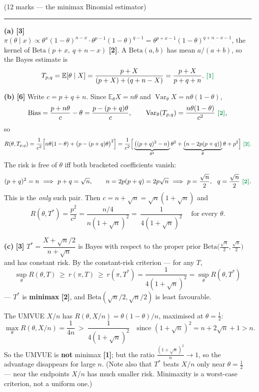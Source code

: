 \documentclass[11pt]{article}
\newcommand{\E}{\mathbb{E}}
\newcommand{\Var}{\operatorname{Var}}
\newcommand{\mk}[1]{{\small\color{ForestGreen}\textbf{[#1]}}}
\newcommand{\qhead}[2]{\bigskip\noindent{\large\bfseries Question #1}\quad\textnormal{\small(#2)}\par
  \vspace{2pt}\hrule\vspace{6pt}}
\begin{document}
\qhead{6}{12 marks --- the minimax Binomial estimator}

\noindent\textbf{(a)} \mk{3}
$\pi(\theta\mid x)\propto\theta^{x}(1-\theta)^{n-x}\cdot\theta^{p-1}(1-\theta)^{q-1}
=\theta^{p+x-1}(1-\theta)^{q+n-x-1}$, the kernel of $\mathrm{Beta}(p+x,\ q+n-x)$ \mk{2}.
A $\mathrm{Beta}(a,b)$ has mean $a/(a+b)$, so the Bayes estimate is
\[
T_{p,q}=\E[\theta\mid X]=\frac{p+X}{(p+X)+(q+n-X)}=\frac{p+X}{p+q+n}. \ \mk{1}
\]

\smallskip\noindent\textbf{(b)} \mk{6}
Write $c=p+q+n$. Since $\E_\theta X=n\theta$ and $\Var_\theta X=n\theta(1-\theta)$,
\[
\text{Bias}=\frac{p+n\theta}{c}-\theta=\frac{p-(p+q)\theta}{c},
\qquad
\Var_\theta(T_{p,q})=\frac{n\theta(1-\theta)}{c^{2}}\ \mk{2},
\]
so
\[
R(\theta,T_{p,q})=\frac{1}{c^{2}}\Big[n\theta(1-\theta)+\big(p-(p+q)\theta\big)^{2}\Big]
=\frac{1}{c^{2}}\Big[\underbrace{\big((p+q)^{2}-n\big)}_{\theta^{2}}\theta^{2}
+\underbrace{\big(n-2p(p+q)\big)}_{\theta}\theta+p^{2}\Big]\ \mk{2}.
\]
The risk is free of $\theta$ iff both bracketed coefficients vanish:
\[
(p+q)^{2}=n\ \Longrightarrow\ p+q=\sqrt n,
\qquad
n=2p(p+q)=2p\sqrt n\ \Longrightarrow\ p=\frac{\sqrt n}{2},\ \ q=\frac{\sqrt n}{2}\ \mk{2}.
\]
This is the \emph{only} such pair. Then $c=n+\sqrt n=\sqrt n(1+\sqrt n)$ and
\[
R(\theta,T^{*})=\frac{p^{2}}{c^{2}}=\frac{n/4}{n(1+\sqrt n)^{2}}
=\boxed{\ \frac{1}{4(1+\sqrt n)^{2}}\ }\quad\text{for every }\theta .
\]

\smallskip\noindent\textbf{(c)} \mk{3}
$T^{*}=\dfrac{X+\sqrt n/2}{n+\sqrt n}$ is Bayes with respect to the proper prior
$\mathrm{Beta}\big(\tfrac{\sqrt n}{2},\tfrac{\sqrt n}{2}\big)$ and has constant risk. By the
constant-risk criterion --- for any $T$,
\[
\sup_\theta R(\theta,T)\ \ge\ r(\pi,T)\ \ge\ r(\pi,T^{*})=\frac{1}{4(1+\sqrt n)^{2}}
=\sup_\theta R(\theta,T^{*})
\]
--- $T^{*}$ is \textbf{minimax} \mk{2}, and $\mathrm{Beta}(\sqrt n/2,\sqrt n/2)$ is least
favourable.

The UMVUE $X/n$ has $R(\theta,X/n)=\theta(1-\theta)/n$, maximised at $\theta=\tfrac12$:
\[
\max_\theta R(\theta,X/n)=\frac{1}{4n}\ >\ \frac{1}{4(1+\sqrt n)^{2}}
\quad\text{since }(1+\sqrt n)^{2}=n+2\sqrt n+1>n .
\]
So the UMVUE is \textbf{not} minimax \mk{1}; but the ratio
$\frac{(1+\sqrt n)^{2}}{n}\to1$, so the advantage disappears for large $n$. (Note also that
$T^{*}$ beats $X/n$ only near $\theta=\tfrac12$ --- near the endpoints $X/n$ has much smaller
risk. Minimaxity is a worst-case criterion, not a uniform one.)
\end{document}
